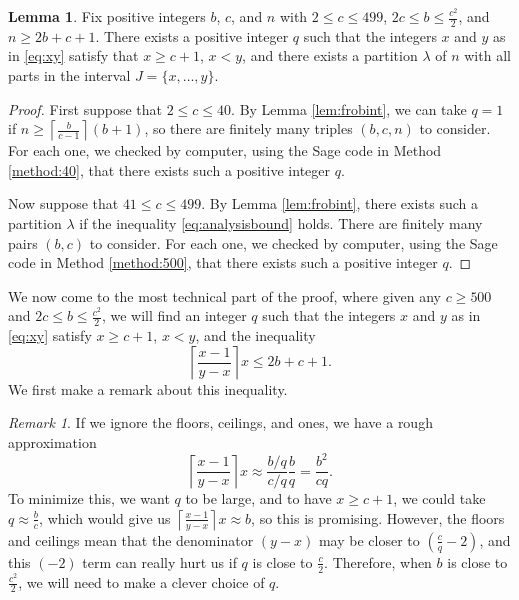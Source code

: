 \documentclass[12pt]{amsart}  %
\theoremstyle{definition}
\newtheorem{lemma}[theorem]{Lemma}
\theoremstyle{remark}
\newtheorem{remark}[theorem]{Remark}
\numberwithin{equation}{section}
\begin{document}
\begin{lemma}\label{lem:smallc}
Fix positive integers $b$, $c$, and $n$ with $2\leq c\leq 499$, $2c\leq b\leq \frac{c^2}2$, and $n\geq 2b+c+1$. There exists a positive integer $q$ such that the integers $x$ and $y$ as in \eqref{eq:xy} satisfy that $x\geq c+1$, $x<y$, and there exists a partition $\lambda$ of $n$ with all parts in the interval $J=\{x,\ldots,y\}$.
\end{lemma}

\begin{proof}
First suppose that $2\leq c\leq 40$. By Lemma \ref{lem:frobint}, we can take $q=1$ if $n\geq\left\lceil\frac b{c-1}\right\rceil(b+1)$, so there are finitely many triples $(b,c,n)$ to consider. For each one, we checked by computer, using the Sage code in Method \ref{method:40}, that there exists such a positive integer $q$.

Now suppose that $41\leq c\leq 499$. By Lemma \ref{lem:frobint}, there exists such a partition $\lambda$ if the inequality \eqref{eq:analysisbound} holds. There are finitely many pairs $(b,c)$ to consider. For each one, we checked by computer, using the Sage code in Method \ref{method:500}, that there exists such a positive integer $q$.
\end{proof}

We now come to the most technical part of the proof, where given any $c\geq 500$ and $2c\leq b\leq\frac{c^2}2$, we will find an integer $q$ such that the integers $x$ and $y$ as in \eqref{eq:xy} satisfy $x\geq c+1$, $x<y$, and the inequality 
\begin{equation}
\left\lceil\frac{x-1}{y-x}\right\rceil x\leq 2b+c+1.
\end{equation} We first make a remark about this inequality.

\begin{remark}
If we ignore the floors, ceilings, and ones, we have a rough approximation
\begin{equation*}
\left\lceil\frac{x-1}{y-x}\right\rceil x\approx \frac{b/q}{c/q}\frac bq=\frac{b^2}{cq}.
\end{equation*}
To minimize this, we want $q$ to be large, and to have $x\geq c+1$, we could take $q\approx \frac bc$, which would give us $\left\lceil\frac{x-1}{y-x}\right\rceil x\approx b$, so this is promising. However, the floors and ceilings mean that the denominator $(y-x)$ may be closer to $(\frac cq-2)$, and this $(-2)$ term can really hurt us if $q$ is close to $\frac c2$. Therefore, when $b$ is close to $\frac{c^2}2$, we will need to make a clever choice of $q$.
\end{remark}
\end{document}
